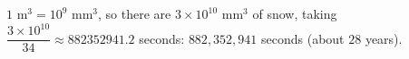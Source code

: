 $1\text{ m}^3=10^9\text{ mm}^3$, so there are $3\times10^{10}$ mm$^3$ of snow, taking $\dfrac{3\times10^{10}}{34}\approx882352941.2$ seconds: $\boxed{882{,}352{,}941}$ seconds (about $28$ years).
